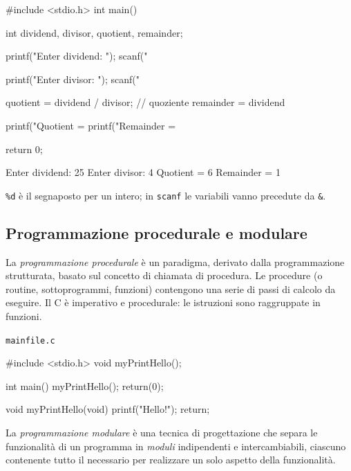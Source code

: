 \documentclass[11pt,a4paper]{article}
\begin{document}
\begin{esempio}
\begin{codice}
#include <stdio.h>
int main() {
    int dividend, divisor, quotient, remainder;

    printf("Enter dividend: ");
    scanf("%

    printf("Enter divisor: ");
    scanf("%

    quotient = dividend / divisor;    // quoziente
    remainder = dividend %

    printf("Quotient = %
    printf("Remainder = %

    return 0;
}
\end{codice}
\begin{risultato}
Enter dividend: 25
Enter divisor: 4
Quotient = 6
Remainder = 1
\end{risultato}
\end{esempio}

\begin{osservazione}
\lstinline|%d| è il segnaposto per un intero; in \lstinline|scanf| le variabili
vanno precedute da \lstinline|&|.
\end{osservazione}

\subsection{Programmazione procedurale e modulare}

\begin{definizione}
La \emph{programmazione procedurale} è un paradigma, derivato dalla
programmazione strutturata, basato sul concetto di chiamata di procedura. Le
procedure (o routine, sottoprogrammi, funzioni) contengono una serie di passi di
calcolo da eseguire. Il C è imperativo e procedurale: le istruzioni sono
raggruppate in funzioni.
\end{definizione}

\begin{esempio}
\texttt{mainfile.c}
\begin{codice}
#include <stdio.h>
void myPrintHello();

int main() {
    myPrintHello();
    return(0);
}

void myPrintHello(void) {
    printf("Hello!\n");
    return;
}
\end{codice}
\end{esempio}

\begin{definizione}
La \emph{programmazione modulare} è una tecnica di progettazione che separa le
funzionalità di un programma in \emph{moduli} indipendenti e intercambiabili,
ciascuno contenente tutto il necessario per realizzare un solo aspetto della
funzionalità.
\end{definizione}
\end{document}
